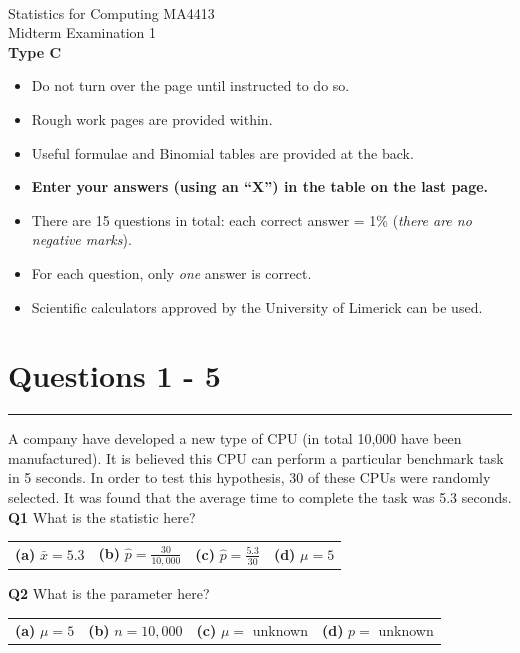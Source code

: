 \documentclass[12pt]{article}
\begin{document}
\quad\\[2cm]

\begin{center}
{\Huge Statistics for Computing MA4413\\[0.8cm]
Midterm Examination 1\\[1cm]
{\bf Type C}}\\[2cm]
\end{center}

\begin{itemize}\itemsep0.6cm
\item Do not turn over the page until instructed to do so.
\item Rough work pages are provided within.
\item Useful formulae and Binomial tables are provided at the back.
\item {\bf Enter your answers (using an ``X'') in the table on the last page.}
\item There are 15 questions in total: each correct answer = 1\% (\emph{there are no negative marks}).
\item For each question, only \emph{one} answer is correct.
\item Scientific calculators approved by the University of Limerick can be used.
\end{itemize}

\newpage
\section*{Questions 1 - 5}

\rule{\linewidth}{1pt}
\quad

A company have developed a new type of CPU (in total 10,000 have been manufactured). It is believed this CPU can perform a particular benchmark task in 5 seconds. In order to test this hypothesis, 30 of these CPUs were randomly selected. It was found that the average time to complete the task was 5.3 seconds.\\[0.3cm]

{\bf Q1} What is the statistic here?\\[0.2cm]
\begin{tabular}{cccc}
{\bf(a)} $\bar x = 5.3$ & {\bf(b)} $\hat p = \frac{30}{10,000}$ & {\bf(c)} $\hat p = \frac{5.3}{30}$ & {\bf(d)} $\mu = 5$ \\[0.6cm]
\end{tabular}

{\bf Q2} What is the parameter here?\\[0.2cm]
\begin{tabular}{cccc}
{\bf(a)} $\mu = 5$ & {\bf(b)} $n = 10,000$ & {\bf(c)} $\mu =$ unknown & {\bf(d)} $p =$ unknown \\[0.6cm]
\end{tabular}
\end{document}

